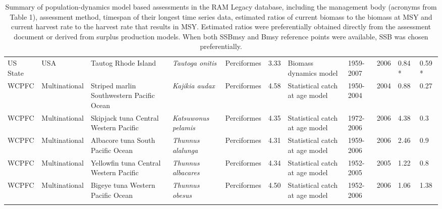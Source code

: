 \begin{longtable}{p{1.5cm}p{1.5cm}p{3cm}p{3cm}p{2.5cm}p{0.9cm}p{1.4cm}p{0.9cm}p{0.9cm}p{0.9cm}p{1cm}}
  US State & USA & Tautog Rhode Island & \textit{Tautoga onitis} & Perciformes & 3.33 & Biomass dynamics model & 1959-2007 & 2006 & 0.84 * & 0.59 * \\ 
  WCPFC & Multinational & Striped marlin Southwestern Pacific Ocean & \textit{Kajikia audax} & Perciformes & 4.58 & Statistical catch at age model & 1950-2004 & 2004 & 0.88 & 0.27 \\ 
  WCPFC & Multinational & Skipjack tuna Central Western Pacific & \textit{Katsuwonus pelamis} & Perciformes & 4.35 & Statistical catch at age model & 1972-2006 & 2006 & 4.38 & 0.3 \\ 
  WCPFC & Multinational & Albacore tuna South Pacific Ocean & \textit{Thunnus alalunga} & Perciformes & 4.31 & Statistical catch at age model & 1959-2006 & 2006 & 2.46 & 0.9 \\ 
  WCPFC & Multinational & Yellowfin tuna Central Western Pacific & \textit{Thunnus albacares} & Perciformes & 4.34 & Statistical catch at age model & 1952-2005 & 2005 & 1.22 & 0.8 \\ 
  WCPFC & Multinational & Bigeye tuna Western Pacific Ocean & \textit{Thunnus obesus} & Perciformes & 4.50 & Statistical catch at age model & 1952-2006 & 2006 & 1.06 & 1.38 \\ 
   \hline
\hline
\caption{Summary of population-dynamics model based assessments in the RAM Legacy database, including the management body (acronyms from Table 1), assessment method, timespan of their longest time series data, estimated ratios of current biomass to the biomass at MSY and current harvest rate to the harvest rate that results in MSY. Estimated ratios were preferentially obtained directly from the assessment document or derived from surplus production models. When both SSBmsy and Bmsy reference points were available, SSB was chosen preferentially.}
\label{tab:crosshair}
\end{longtable}
